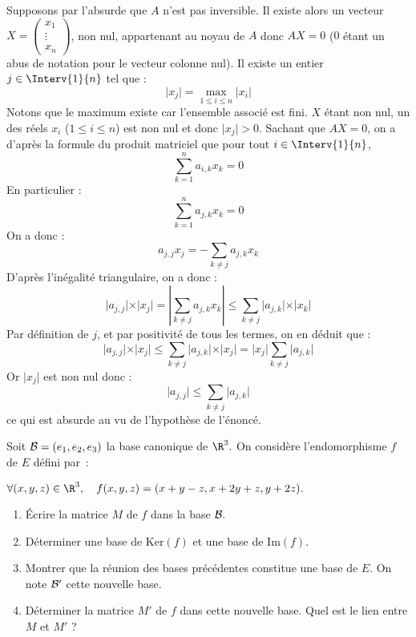 \documentclass[a4paper,10pt]{report}
\begin{document}
\corr Supposons par l'absurde que $A$ n'est pas inversible. Il existe alors un vecteur $X = \begin{pmatrix}
x_1 \\
\vdots \\
x_n
\end{pmatrix}$, non nul, appartenant au noyau de $A$ donc $AX= 0$ ($0$ étant un abus de notation pour le vecteur colonne nul). Il existe un entier $j \in \Interv{1}{n}$ tel que :
$$ \vert x_j \vert = \max_{1 \leq i \leq n} \vert x_i \vert$$
Notons que le maximum existe car l'ensemble associé est fini. $X$ étant non nul, un des réels $x_i$ ($1 \leq i \leq n$) est non nul et donc $\vert x_j \vert >0$. Sachant que $AX=0$, on a d'après la formule du produit matriciel que pour tout $i \in \Interv{1}{n}$,
$$ \sum_{k=1}^n a_{i,k} x_k = 0$$
En particulier :
$$ \sum_{k=1}^n a_{j,k} x_k = 0$$
On a donc :
$$ a_{j,j} x_j = - \sum_{k \neq j} a_{j,k} x_k$$
D'après l'inégalité triangulaire, on a donc :
$$ \vert a_{j,j} \vert \times \vert x_j \vert = \left\vert  \sum_{k \neq j} a_{j,k} x_k \right\vert \leq \sum_{k \neq j} \vert a_{j,k} \vert \times \vert x_k \vert$$
Par définition de $j$, et par positivité de tous les termes, on en déduit que :
$$  \vert a_{j,j} \vert \times \vert x_j \vert \leq \sum_{k \neq j} \vert a_{j,k} \vert \times \vert x_j \vert =  \vert x_j \vert\sum_{k \neq j} \vert a_{j,k} \vert$$
Or $\vert x_j \vert$ est non nul donc :
$$ \vert a_{j,j} \vert  \leq  \sum_{k \neq j} \vert a_{j,k} \vert$$
ce qui est absurde au vu de l'hypothèse de l'énoncé.

\begin{Exa} Soit ${\cal B}=(e_1,e_2,e_3)$ la base canonique de $\R^3.$ On consid\`ere
l'endomorphisme $f$ de $E$ d\'efini par~:

\begin{center}
$\forall (x,y,z)\in\R^3,\quad f(x,y,z)=(x+y-z,x+2y+z,y+2z).$
\end{center}

\begin{enumerate}

\item Écrire la matrice $M$ de $f$ dans la base ${\cal B}.$

\item D\'eterminer une base de $\textrm{Ker}(f)$ et une base de $\textrm{Im}(f)$.

\item Montrer que la r\'eunion des bases pr\'ec\'edentes constitue une base de $E$. On note ${\cal B}'$ cette nouvelle base.

\item  D\'eterminer la matrice $M'$ de $f$ dans cette nouvelle base. Quel est le lien entre $M$ et $M'$ ?
\end{enumerate}

\end{Exa}
\end{document}
